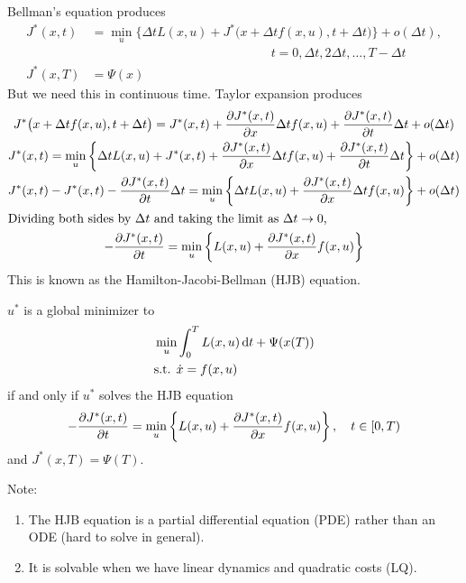 Bellman's equation produces
\begin{align}
  J^*(x,t) &= \min_u \Big\{ \Delta t L(x,u) + J^*\big(x+\Delta t f(x,u),t+\Delta t\big) \Big\} + o(\Delta t), \\
           & \hspace{6cm} t=0,\Delta t,2\Delta t,\dots,T-\Delta t \\
  J^*(x,T) &= \Psi(x)
\end{align}
But we need this in continuous time. Taylor expansion produces
\begin{gather}
  J^*\big(x+\Delta t f(x,u),t+\Delta t\big) = J^*(x,t) + \frac{\partial J^*(x,t)}{\partial x}\Delta tf(x,u) + \frac{\partial J^*(x,t)}{\partial t}\Delta t + o(\Delta t) \\
  J^*(x,t) = \min_u \left\{ \Delta t L(x,u) + J^*(x,t) + \frac{\partial J^*(x,t)}{\partial x}\Delta tf(x,u) + \frac{\partial J^*(x,t)}{\partial t}\Delta t \right\} + o(\Delta t) \\
  J^*(x,t) - J^*(x,t) - \frac{\partial J^*(x,t)}{\partial t}\Delta t = \min_u \left\{ \Delta t L(x,u) + \frac{\partial J^*(x,t)}{\partial x}\Delta tf(x,u) \right\} + o(\Delta t) \\
  \intertext{Dividing both sides by $\Delta t$ and taking the limit as $\Delta t\to0$,}
  -\frac{\partial J^*(x,t)}{\partial t} = \min_u \left\{ L(x,u) + \frac{\partial J^*(x,t)}{\partial x} f(x,u) \right\}
\end{gather}
This is known as the Hamilton-Jacobi-Bellman (HJB) equation.

\begin{thm}
  $u^*$ is a global minimizer to
  \begin{align}
    & \min_u \int_0^T L(x,u)\mathop{}\!\mathrm{d} t + \Psi(x(T)) \\
    & \text{s.t. } \dot x=f(x,u)
  \end{align}
  if and only if $u^*$ solves the HJB equation
  \begin{gather}
    -\frac{\partial J^*(x,t)}{\partial t} = \min_u \left\{ L(x,u) + \frac{\partial J^*(x,t)}{\partial x} f(x,u) \right\}, \quad t\in[0,T) 
  \end{gather}
  and $J^*(x,T)=\Psi(T)$.
\end{thm}

Note:
\begin{enumerate}[nosep]
\item The HJB equation is a partial differential equation (PDE) rather than an ODE (hard to solve in general).
\item It is solvable when we have linear dynamics and quadratic costs (LQ).
\end{enumerate}

